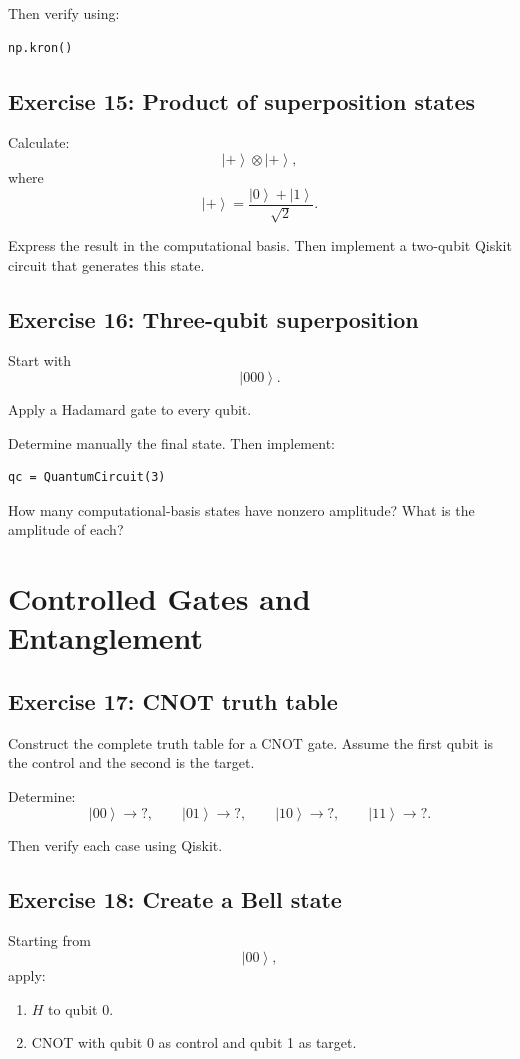\documentclass[12pt,a4paper]{article}
\newcommand{\ket}[1]{\left|#1\right\rangle}
\begin{document}
Then verify using:
\begin{lstlisting}
np.kron()
\end{lstlisting}

\subsection*{Exercise 15: Product of superposition states}
Calculate:
\[
\ket{+}\otimes\ket{+},
\]
where
\[
\ket{+}=
\frac{\ket{0}+\ket{1}}{\sqrt{2}}.
\]

Express the result in the computational basis. Then implement a two-qubit Qiskit circuit that generates this state.

\subsection*{Exercise 16: Three-qubit superposition}
Start with
\[
\ket{000}.
\]

Apply a Hadamard gate to every qubit.

Determine manually the final state. Then implement:
\begin{lstlisting}
qc = QuantumCircuit(3)
\end{lstlisting}

How many computational-basis states have nonzero amplitude? What is the amplitude of each?

\section{Controlled Gates and Entanglement}

\subsection*{Exercise 17: CNOT truth table}
Construct the complete truth table for a CNOT gate. Assume the first qubit is the control and the second is the target.

Determine:
\[
\ket{00}\rightarrow ?,
\qquad
\ket{01}\rightarrow ?,
\qquad
\ket{10}\rightarrow ?,
\qquad
\ket{11}\rightarrow ?.
\]

Then verify each case using Qiskit.

\subsection*{Exercise 18: Create a Bell state}
Starting from
\[
\ket{00},
\]
apply:
\begin{enumerate}
    \item $H$ to qubit 0.
    \item CNOT with qubit 0 as control and qubit 1 as target.
\end{enumerate}
\end{document}
